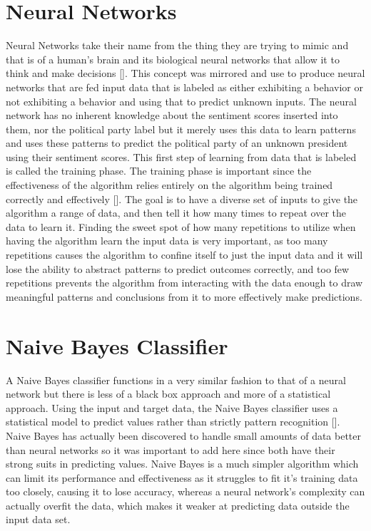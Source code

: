 \section{Neural Networks}
Neural Networks take their name from the thing they are trying to mimic and that is of a human's brain and its biological neural networks that allow it to think and make decisions [\cite{hansen1990neural}].
This concept was mirrored and use to produce neural networks that are fed input data that is labeled as either exhibiting a behavior or not exhibiting a behavior and using that to predict unknown inputs.
The neural network has no inherent knowledge about the sentiment scores inserted into them, nor the political party label but it merely uses this data to learn patterns and uses these patterns to predict the political party of an unknown president using their sentiment scores.
This first step of learning from data that is labeled is called the training phase.
The training phase is important since the effectiveness of the algorithm relies entirely on the algorithm being trained correctly and effectively [\cite{hepner1990artificial}].
The goal is to have a diverse set of inputs to give the algorithm a range of data, and then tell it how many times to repeat over the data to learn it.
Finding the sweet spot of how many repetitions to utilize when having the algorithm learn the input data is very important, as too many repetitions causes the algorithm to confine itself to just the input data and it will lose the ability to abstract patterns to predict outcomes correctly, and too few repetitions prevents the algorithm from interacting with the data enough to draw meaningful patterns and conclusions from it to more effectively make predictions.

\section{Naive Bayes Classifier}
A Naive Bayes classifier functions in a very similar fashion to that of a neural network but there is less of a black box approach and more of a statistical approach.
Using the input and target data, the Naive Bayes classifier uses a statistical model to predict values rather than strictly pattern recognition [\cite{murphy2006naive}].
Naive Bayes has actually been discovered to handle small amounts of data better than neural networks so it was important to add here since both have their strong suits in predicting values.
Naive Bayes is a much simpler algorithm which can limit its performance and effectiveness as it struggles to fit it's training data too closely, causing it to lose accuracy, whereas a neural network's complexity can actually overfit the data, which makes it weaker at predicting data outside the input data set.

